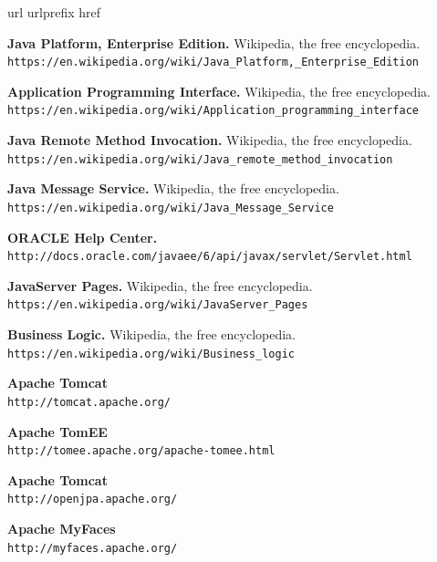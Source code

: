 \documentclass[a4paper, 10pt]{article}
\begin{document}
\newpage
\begin{thebibliography}{10}
	\expandafter\ifx\csname url\endcsname\relax
	  \def\url#1{\texttt{#1}}\fi
	\expandafter\ifx\csname urlprefix\endcsname\relax\def\urlprefix{URL }\fi
	\expandafter\ifx\csname href\endcsname\relax
	  \def\href#1#2{#2} \def\path#1{#1}\fi
	
	\textbf{Java Platform, Enterprise Edition.} Wikipedia, the free encyclopedia.\\
		\url{https://en.wikipedia.org/wiki/Java_Platform,_Enterprise_Edition}
	
	\textbf{Application Programming Interface.} Wikipedia, the free encyclopedia.\\
		\url{https://en.wikipedia.org/wiki/Application_programming_interface}
	
	\textbf{Java Remote Method Invocation.} Wikipedia, the free encyclopedia.\\
		\url{https://en.wikipedia.org/wiki/Java_remote_method_invocation}
	
	\textbf{Java Message Service.} Wikipedia, the free encyclopedia.\\
		\url{https://en.wikipedia.org/wiki/Java_Message_Service}
	
	\textbf{ORACLE Help Center.}\\
		\url{http://docs.oracle.com/javaee/6/api/javax/servlet/Servlet.html}
	
	\textbf{JavaServer Pages.} Wikipedia, the free encyclopedia.\\
		\url{https://en.wikipedia.org/wiki/JavaServer_Pages}
	
	\textbf{Business Logic.} Wikipedia, the free encyclopedia.\\
		\url{https://en.wikipedia.org/wiki/Business_logic}
	
	\textbf{Apache Tomcat}\\
		\url{http://tomcat.apache.org/}

	\textbf{Apache TomEE}\\
		\url{http://tomee.apache.org/apache-tomee.html}

	\textbf{Apache Tomcat}\\
		\url{http://openjpa.apache.org/}

	\textbf{Apache MyFaces}\\
		\url{http://myfaces.apache.org/}


\end{thebibliography}
\end{document}

